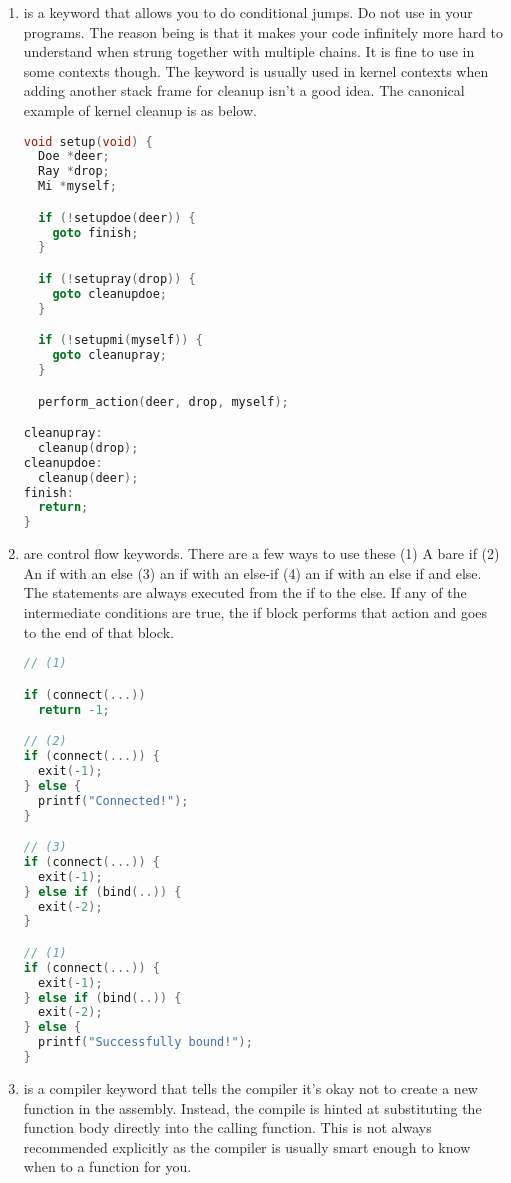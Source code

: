 \begin{enumerate}
	\item {} is a keyword that allows you to do conditional jumps. Do not use  in your programs. The reason being is that it makes your code infinitely more hard to understand when strung together with multiple chains. It is fine to use in some contexts though. The keyword is usually used in kernel contexts when adding another stack frame for cleanup isn't a good idea. The canonical example of kernel cleanup is as below.

	      \begin{lstlisting}[language=C]
void setup(void) {
  Doe *deer;
  Ray *drop;
  Mi *myself;

  if (!setupdoe(deer)) {
    goto finish;
  } 

  if (!setupray(drop)) {
    goto cleanupdoe;
  } 

  if (!setupmi(myself)) {
    goto cleanupray;
  }

  perform_action(deer, drop, myself);

cleanupray:
  cleanup(drop);
cleanupdoe:
  cleanup(deer);
finish:
  return;
} 
\end{lstlisting}
	\item {} are control flow keywords. There are a few ways to use these (1) A bare if (2) An if with an else (3) an if with an else-if (4) an if with an else if and else. The statements are always executed from the if to the else. If any of the intermediate conditions are true, the if block performs that action and goes to the end of that block.

	      \begin{lstlisting}[language=C]
// (1)

if (connect(...))
  return -1;

// (2)
if (connect(...)) {
  exit(-1);
} else {
  printf("Connected!");
}

// (3)
if (connect(...)) {
  exit(-1);
} else if (bind(..)) {
  exit(-2);
}

// (1)
if (connect(...)) {
  exit(-1);
} else if (bind(..)) {
  exit(-2);
} else {
  printf("Successfully bound!");
}
\end{lstlisting}

	\item {} is a compiler keyword that tells the compiler it's okay not to create a new function in the assembly. Instead, the compile is hinted at substituting the function body directly into the calling function. This is not always recommended explicitly as the compiler is usually smart enough to know when to  a function for you.


\end{enumerate}
